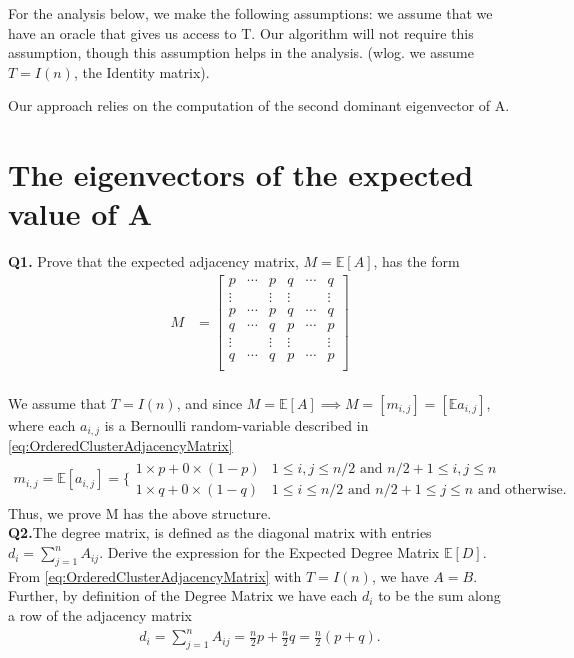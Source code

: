 \documentclass[9pt]{article}
\def\E{\mathbb{E}} %
\begin{document}
For the analysis below, we make the following assumptions: we assume that we have an oracle that gives us access to T. Our algorithm will not require this assumption, though this assumption helps in the analysis. (wlog. we assume $T = I(n)$, the Identity matrix).

Our approach relies on the computation of the second dominant eigenvector of A.

\section{The eigenvectors of the expected value of A}

\textbf{Q1.} Prove that the expected adjacency matrix, $M = \E{[A]}$, has the form
\begin{align}
M &= \begin{bmatrix}
p & \cdots &p&q&\cdots&q\\
\vdots &  &\vdots &\vdots & &\vdots\\
p & \cdots &p&q&\cdots&q\\
q & \cdots &q&p&\cdots&p\\
\vdots &  &\vdots &\vdots & &\vdots\\
q & \cdots &q&p&\cdots&p\\
\end{bmatrix}
\end{align}\\
We assume that $T = I(n)$, and since $M = \E{[A]} \implies M = [m_{i,j}] = [\E{a_{i,j}}]$, where each $a_{i,j}$ is a Bernoulli random-variable described in \eqref{eq:OrderedClusterAdjacencyMatrix}
\begin{align}
m_{i,j} = \E{[a_{i,j}]} = \Bigg\lbrace \begin{array}{cc}
1 \times p + 0 \times (1-p) & 1\leq i,j \leq n/2 \text{ and } n/2+1 \leq i,j \leq n\\
1 \times q + 0 \times (1-q) & 1 \leq i \leq n/2 \text{ and } n/2+1 \leq j \leq n \text{ and otherwise.}
\end{array}
\end{align}
Thus, we prove M has the above structure.\\


\textbf{Q2.}The degree matrix, is defined as the diagonal matrix with entries $d_i = \sum_{j=1}^n A_{ij}$. Derive the expression for the Expected Degree Matrix $\E{[D]}$.\\
From \eqref{eq:OrderedClusterAdjacencyMatrix} with $T = I(n)$, we have $A = B$. Further, by definition of the Degree Matrix we have each $d_i$ to be the sum along a row of the adjacency matrix
\begin{align}
d_i = \sum_{j=1}^n A_{ij} = \frac{n}{2} p + \frac{n}{2} q = \frac{n}{2}(p+q).
\end{align}
\end{document}
